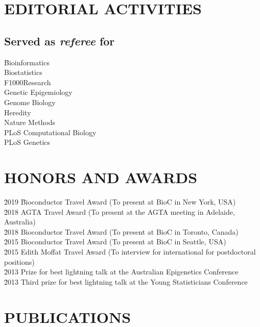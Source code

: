 \documentclass[11pt,letterpaper,pdf]{article}
\begin{document}
\section*{EDITORIAL ACTIVITIES}

\subsection*{Served as \textit{referee} for}

\begin{tabbing}
  \=Bioinformatics\\
  \>Biostatistics\\
  \>F1000Research\\
  \>Genetic Epigemiology\\
  \>Genome Biology\\
  \>Heredity\\
  \>Nature Methods\\
  \>PLoS Computational Biology\\
  \>PLoS Genetics\\
\end{tabbing}

\section*{HONORS AND AWARDS}

\begin{tabbing}
  \= 2019 \hspace*{0.5cm} \= Bioconductor Travel Award (To present at BioC in New York, USA)\\
  \= 2018 \> AGTA Travel Award (To present at the AGTA meeting in Adelaide, Australia)\\
  \= 2018 \> Bioconductor Travel Award (To present at BioC in Toronto, Canada)\\
  \= 2015 \> Bioconductor Travel Award (To present at BioC in Seattle, USA)\\
  \= 2015 \> Edith Moffat Travel Award (To interview for international for postdoctoral positions)\\
  \= 2013 \> Prize for best lightning talk at the Australian Epigenetics Conference\\
  \= 2013 \> Third prize for best lightning talk at the Young Statisticians Conference
\end{tabbing}

\section*{PUBLICATIONS}
\end{document}
